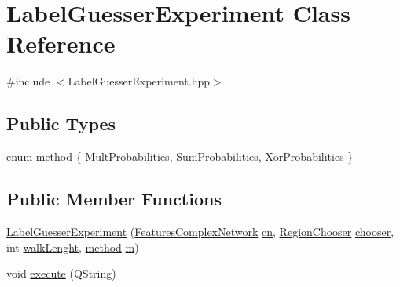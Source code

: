 \hypertarget{class_label_guesser_experiment}{\section{Label\+Guesser\+Experiment Class Reference}
\label{class_label_guesser_experiment}
}


{\ttfamily \#include $<$Label\+Guesser\+Experiment.\+hpp$>$}

\subsection*{Public Types}
\begin{DoxyCompactItemize}
\item 
enum \hyperlink{class_label_guesser_experiment_a8c3db06a56bf1ad7513c20a7b80da3ec}{method} \{ \hyperlink{class_label_guesser_experiment_a8c3db06a56bf1ad7513c20a7b80da3eca1cde43306c88632461a9c42260a030fc}{Mult\+Probabilities}, 
\hyperlink{class_label_guesser_experiment_a8c3db06a56bf1ad7513c20a7b80da3eca648e260351661fcd059db11046e060bc}{Sum\+Probabilities}, 
\hyperlink{class_label_guesser_experiment_a8c3db06a56bf1ad7513c20a7b80da3eca1ec77d74a50b79782fda1db1fae44a26}{Xor\+Probabilities}
 \}
\end{DoxyCompactItemize}
\subsection*{Public Member Functions}
\begin{DoxyCompactItemize}
\item 
\hyperlink{class_label_guesser_experiment_a438d9b15fbe69efc950d4c1aafd337d4}{Label\+Guesser\+Experiment} (\hyperlink{class_features_complex_network}{Features\+Complex\+Network} \hyperlink{class_label_guesser_experiment_a94903226a99f02913d3e104ccc510880}{cn}, \hyperlink{class_region_chooser}{Region\+Chooser} \hyperlink{class_label_guesser_experiment_a76efedf726d4e95b9c8b2caff4b563cf}{chooser}, int \hyperlink{class_label_guesser_experiment_a5038af94a1310577da234f589c19c77e}{walk\+Lenght}, \hyperlink{class_label_guesser_experiment_a8c3db06a56bf1ad7513c20a7b80da3ec}{method} \hyperlink{class_label_guesser_experiment_a0a0032a29818ba490865d85ac1403b0d}{m})
\item 
void \hyperlink{class_label_guesser_experiment_a6fef3579411d12ac3bfa27f7cff5e71c}{execute} (Q\+String)
\end{DoxyCompactItemize}
